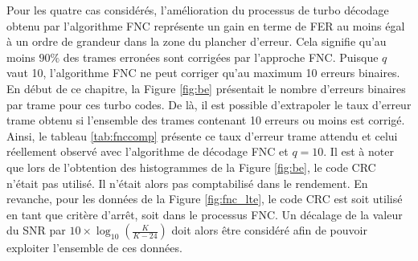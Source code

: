 Pour les quatre cas considérés, l'amélioration du processus de turbo décodage obtenu par l'algorithme FNC représente un
gain en terme de FER au moins égal à un ordre de grandeur dans la zone du plancher d'erreur. Cela signifie qu'au moins 
$90\%$ des trames erronées sont corrigées par l'approche FNC. 
Puisque $q$ vaut 10, l'algorithme FNC ne peut corriger qu'au maximum 10 erreurs binaires. En début de ce chapitre, la 
Figure \ref{fig:be} présentait le nombre d'erreurs binaires par trame pour ces turbo codes. De là, il est possible 
d'extrapoler le taux d'erreur trame obtenu si l'ensemble des trames contenant 10 erreurs ou moins est corrigé. Ainsi, 
le tableau \ref{tab:fnccomp} présente ce taux d'erreur trame attendu et celui réellement observé avec l'algorithme de décodage
FNC et $q=10$. Il est à noter que lors de 
l'obtention des histogrammes de la Figure \ref{fig:be}, le code CRC n'était pas utilisé. Il n'était alors pas comptabilisé dans 
le rendement. En revanche, pour les données de la Figure \ref{fig:fnc_lte}, le code CRC est soit utilisé en tant que critère 
d'arrêt, soit dans le processus FNC. Un décalage de la valeur du SNR par $10\times \log_{10}\left(\frac{K}{K-24}\right)$
doit alors être considéré afin de pouvoir exploiter l'ensemble de ces données.
